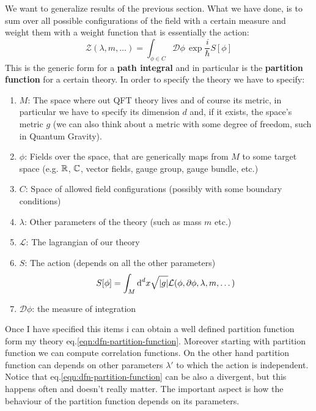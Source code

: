 \documentclass[../main/main.tex]{subfiles}
\begin{document}
We want to generalize results of the previous section. 
What we have done, is to sum over all possible configurations of the field with a certain measure and weight them with a weight function that is essentially the action:
\begin{equation}\label{eqn:dfn-partition-function}\boxed{
\mathcal Z(\lambda, m,\dots)=\int_{\phi\in C}\mathcal  D\phi\,\exp{\frac i\hbar S[\phi]}
}\end{equation}
This is the generic form for a \textbf{path integral} and in particular is the \textbf{partition function} for a certain theory. In order to specify the theory we have to specify:
\begin{enumerate}
\item $M$: The space where out QFT theory lives and of course its metric, in particular we have to specify its dimension $d$ and, if it exists, the space's metric $g$ (we can also think about a metric with some degree of freedom, such in Quantum Gravity).
\item $\phi$: Fields over the space, that are generically maps from $M$ to some target space (e.g. $\mathbb{R}$, $\mathbb{C}$, vector fields, gauge group, gauge bundle, etc.)
\item $C$: Space of allowed field configurations (possibly with some boundary conditions)
\item $\lambda$: Other parameters of the theory (such as mass $m$ etc.)
\item $\mathcal L$: The lagrangian of our theory
\item $S$: The action (depends on all the other parameters)
\[S[\phi]=\int_M\textup{d}^dx\sqrt{|g|}\mathcal L(\phi, \partial \phi, \lambda, m, \dots)\]
\item$\mathcal D\phi$: the measure of integration
\end{enumerate}

Once I have specified this items i can obtain a well defined partition function form my theory eq.\eqref{eqn:dfn-partition-function}. Moreover starting with partition function we can compute correlation functions.
On the other hand partition function can depends on other parameters $\lambda'$ to which the action is independent. Notice that  eq.\eqref{eqn:dfn-partition-function} can be also a divergent, but this happens often and doesn't really matter. The important aspect is how the behaviour of the partition function depends on its parameters. 
\end{document}
